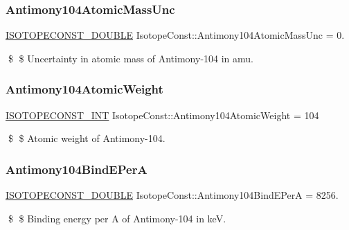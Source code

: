 \subsubsection{\texorpdfstring{Antimony104\+Atomic\+Mass\+Unc}{Antimony104AtomicMassUnc}}
{\footnotesize\ttfamily \mbox{\hyperlink{group___isotope_const-_macros_ga8f45a7272ce02c0b4c65c44636ed719a}{I\+S\+O\+T\+O\+P\+E\+C\+O\+N\+S\+T\+\_\+\+D\+O\+U\+B\+LE}} Isotope\+Const\+::\+Antimony104\+Atomic\+Mass\+Unc = 0.}

\$ \$ Uncertainty in atomic mass of Antimony-\/104 in amu. \mbox{\label{group___isotope_const-_antimony-_sb104_ga83fb77a88577cd4f6bbc5cb093abdba7}} 
\subsubsection{\texorpdfstring{Antimony104\+Atomic\+Weight}{Antimony104AtomicWeight}}
{\footnotesize\ttfamily \mbox{\hyperlink{group___isotope_const-_macros_ga5f18360b3e99483a35c32d789e62621c}{I\+S\+O\+T\+O\+P\+E\+C\+O\+N\+S\+T\+\_\+\+I\+NT}} Isotope\+Const\+::\+Antimony104\+Atomic\+Weight = 104}

\$ \$ Atomic weight of Antimony-\/104. \mbox{\label{group___isotope_const-_antimony-_sb104_gab7bef305609c4fb7517a3df974932b47}} 
\subsubsection{\texorpdfstring{Antimony104\+Bind\+E\+PerA}{Antimony104BindEPerA}}
{\footnotesize\ttfamily \mbox{\hyperlink{group___isotope_const-_macros_ga8f45a7272ce02c0b4c65c44636ed719a}{I\+S\+O\+T\+O\+P\+E\+C\+O\+N\+S\+T\+\_\+\+D\+O\+U\+B\+LE}} Isotope\+Const\+::\+Antimony104\+Bind\+E\+PerA = 8256.}

\$ \$ Binding energy per A of Antimony-\/104 in keV. \mbox{\label{group___isotope_const-_antimony-_sb104_ga3f33c0347d6d08296b87dc5f8ffcb916}} 

